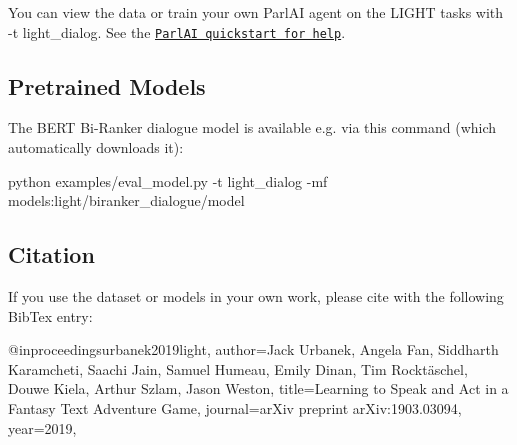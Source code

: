 You can view the data or train your own Parl\+AI agent on the L\+I\+G\+HT tasks with {\ttfamily -\/t light\+\_\+dialog}. See the \href{http://www.parl.ai/static/docs/tutorial_quick.html}{\tt Parl\+AI quickstart for help}.

\subsection*{Pretrained Models}

The B\+E\+RT Bi-\/\+Ranker dialogue model is available e.\+g. via this command (which automatically downloads it)\+: \begin{DoxyVerb}python examples/eval_model.py -t light_dialog -mf models:light/biranker_dialogue/model
\end{DoxyVerb}


\subsection*{Citation}

If you use the dataset or models in your own work, please cite with the following Bib\+Tex entry\+: \begin{DoxyVerb}@inproceedings{urbanek2019light,
  author={Jack Urbanek, Angela Fan, Siddharth Karamcheti, Saachi Jain, Samuel Humeau, Emily Dinan, Tim Rocktäschel, Douwe Kiela, Arthur Szlam, Jason Weston},
  title={Learning to Speak and Act in a Fantasy Text Adventure Game},
  journal={arXiv preprint arXiv:1903.03094},
  year={2019},
}\end{DoxyVerb}
 